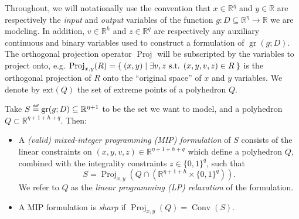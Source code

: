 \documentclass[smallextended]{svjour3}
\newcommand{\blue}[1]{{#1}}
\newcommand{\bbR}{\mathbb{R}}
\newcommand{\Conv}{\operatorname{Conv}}
\newcommand{\gr}{\operatorname{gr}}
\newcommand{\Proj}{\operatorname{Proj}}
\newcommand\defeq{\mathrel{\overset{\makebox[0pt]{\mbox{\normalfont\tiny\sffamily def}}}{=}}}
\newcommand{\Authornote}[3]{{\small\textcolor{#2}{\sf$<${  #1: #3}$>$}}}
\newcommand{\wnote}[1]{\Authornote{Will}{Magenta}{#1}}
\newcommand{\cnote}[1]{\Authornote{Christian}{ForestGreen}{#1}}
\begin{document}
\begin{definition} \label{def:ideal}
    Throughout, we will notationally use the convention that $x \in \bbR^\eta$ \blue{and $y \in \bbR$ are respectively the \emph{input} and  \emph{output} variables of the function $g:D\subseteq \bbR^\eta\to \bbR$ we are modeling. In addition, $v \in \bbR^h$ and $z \in \bbR^q$ are respectively any auxiliary continuous and binary variables used to construct a formulation of $\gr(g; D)$}. The orthogonal projection operator $\Proj$ will be subscripted by the variables to project onto, e.g. $\Proj_{x,y}(R) = \Set{(x,y) | \exists v, z \text{ s.t. } (x,y,v,z) \in R}$ is the orthogonal projection of $R$ onto the ``original space'' of $x$ and $y$ variables. We denote by $\text{ext}(Q)$ the set of extreme points of a polyhedron $Q$.
    
    Take  $S\defeq\gr(g; D) \subseteq \bbR^{\eta+1}$ \blue{to be the set} we want to model, and a polyhedron $Q \subset \bbR^{\eta + 1 + \blue{h} + q}$. Then:
    \begin{itemize}
        \item A \emph{(valid) mixed-integer programming (MIP) formulation} of $S$ consists of the linear constraints on $(x,y,v,z)\in\bbR^{\eta + 1 + \blue{h} + q}$ which define a polyhedron $Q$, combined with the integrality constraints $z \in \{0,1\}^q$, such that
        \[
            S = \Proj_{x,y}\left(Q \cap (\bbR^{\eta + 1 + \blue{h}} \times \{0,1\}^q)\right).
        \]
        We refer to $Q$ as the \emph{linear programming (LP) relaxation} of the formulation.
        \item A MIP formulation is \emph{sharp} if $\Proj_{x,y}(Q) = \Conv(S)$.

\end{itemize}
\end{definition}
\end{document}
